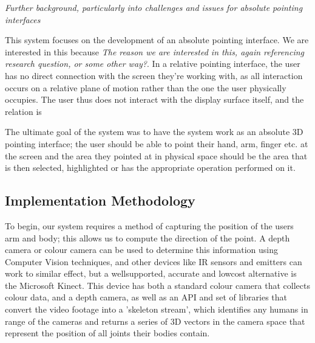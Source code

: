 \textit{Further background, particularly into challenges and issues for absolute pointing interfaces}

This system focuses on the development of an absolute pointing interface. We are interested in this because \textit{The reason we are interested in this, again referencing research question, or some other way?}. In a relative pointing interface, the user has no direct connection with the screen they're working with, as all interaction occurs on a relative plane of motion rather than the one the user physically occupies. The user thus does not interact with the display surface itself, and the relation is 

The ultimate goal of the system was to have the system work as an absolute 3D pointing interface; the user should be able to point their hand, arm, finger etc. at the screen and the area they pointed at in physical space should be the area that is then selected, highlighted or has the appropriate operation performed on it. 

\subsection{Implementation Methodology}

To begin, our system requires a method of capturing the position of the users arm and body; this allows us to compute the direction of the point. A depth camera or colour camera can be used to determine this information using  Computer Vision techniques, and other devices like IR sensors and emitters can work to similar effect, but a well\-supported, accurate and low\-cost alternative is the Microsoft Kinect. This device has both a standard colour camera that collects colour data, and a depth camera, as well as an API and set of libraries that convert the video footage into a 'skeleton stream', which identifies any humans in range of the cameras and returns a series of 3D vectors in the camera space that represent the position of all joints their bodies contain.

